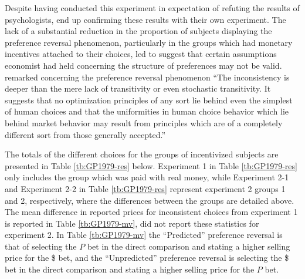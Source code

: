 \documentclass[11pt,a4paper]{report}
\begin{document}
Despite having conducted this experiment in expectation of refuting the results of psychologists, \textcite{Grether1979} end up confirming these results with their own experiment.
The lack of a substantial reduction in the proportion of subjects displaying the preference reversal phenomenon, particularly in the groups which had monetary incentives attached to their choices, led \textcite{Grether1979} to suggest that certain assumptions economist had held concerning the structure of preferences may not be valid.
\textcite[623]{Grether1979} remarked concerning the preference reversal phenomenon \enquote{The inconsistency is deeper than the mere lack of transitivity or even stochastic transitivity.
It suggests that no optimization principles of any sort lie behind even the simplest of human choices and that the uniformities in human choice behavior which lie behind market behavior may result from principles which are of a completely different sort from those generally accepted.} 

The totals of the different choices for the groups of incentivized subjects are presented in Table \ref{tb:GP1979-res} below.
Experiment 1 in Table \ref{tb:GP1979-res} only includes the group which was paid with real money, while Experiment 2-1 and Experiment 2-2 in Table \ref{tb:GP1979-res} represent experiment 2 groups 1 and 2, respectively,  where the differences between the groups are detailed above.
The mean difference in reported prices for inconsistent choices from experiment 1 is reported in Table \ref{tb:GP1979-mv}, \textcite{Grether1979} did not report these statistics for experiment 2.
In Table \ref{tb:GP1979-mv} the \enquote{Predicted} preference reversal is that of selecting the $P$ bet in the direct comparison and stating a higher selling price for the \$ bet, and the \enquote{Unpredicted} preference reversal is selecting the \$ bet in the direct comparison and stating a higher selling price for the $P$ bet.
\end{document}
